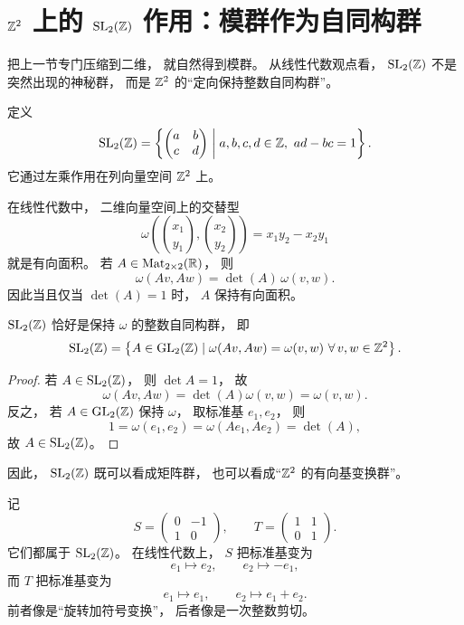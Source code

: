 \section{$\mathbb{Z}^2$ 上的 $\mathrm{SL}_2(\mathbb{Z})$ 作用：模群作为自同构群}




把上一节专门压缩到二维， 就自然得到模群。 从线性代数观点看， $\mathrm{SL}_2(\mathbb{Z})$ 不是突然出现的神秘群， 而是 $\mathbb{Z}^2$ 的“定向保持整数自同构群”。




\begin{definition}[模群] 定义 \[ \mathrm{SL}_2(\mathbb{Z})= \left\{ \begin{pmatrix} a&b\\ c&d \end{pmatrix} \;\middle|\; a,b,c,d\in\mathbb{Z},\ ad-bc=1 \right\}. \] 它通过左乘作用在列向量空间 $\mathbb{Z}^2$ 上。 \end{definition} 在线性代数中， 二维向量空间上的交替型 \[ \omega\!\left( \binom{x_1}{y_1}, \binom{x_2}{y_2} \right)=x_1y_2-x_2y_1 \] 就是有向面积。 若 $A\in \mathrm{Mat}_{2\times2}(\mathbb{R})$， 则 \[ \omega(Av,Aw)=\det(A)\,\omega(v,w). \] 因此当且仅当 $\det(A)=1$ 时， $A$ 保持有向面积。




\begin{proposition} $\mathrm{SL}_2(\mathbb{Z})$ 恰好是保持 $\omega$ 的整数自同构群， 即 \[ \mathrm{SL}_2(\mathbb{Z})= \left\{ A\in \mathrm{GL}_2(\mathbb{Z})\mid \omega(Av,Aw)=\omega(v,w)\ \forall\,v,w\in\mathbb{Z}^2 \right\}. \] \end{proposition}




\begin{proof} 若 $A\in \mathrm{SL}_2(\mathbb{Z})$， 则 $\det A=1$， 故 \[ \omega(Av,Aw)=\det(A)\omega(v,w)=\omega(v,w). \] 反之， 若 $A\in\mathrm{GL}_2(\mathbb{Z})$ 保持 $\omega$， 取标准基 $e_1,e_2$， 则 \[ 1=\omega(e_1,e_2)=\omega(Ae_1,Ae_2)=\det(A), \] 故 $A\in\mathrm{SL}_2(\mathbb{Z})$。 \end{proof} 因此， $\mathrm{SL}_2(\mathbb{Z})$ 既可以看成矩阵群， 也可以看成“$\mathbb{Z}^2$ 的有向基变换群”。




\begin{example}[两个基本生成元] 记 \[ S= \begin{pmatrix} 0&-1\\ 1&0 \end{pmatrix}, \qquad T= \begin{pmatrix} 1&1\\ 0&1 \end{pmatrix}. \] 它们都属于 $\mathrm{SL}_2(\mathbb{Z})$。 在线性代数上， $S$ 把标准基变为 \[ e_1\mapsto e_2,\qquad e_2\mapsto -e_1, \] 而 $T$ 把标准基变为 \[ e_1\mapsto e_1,\qquad e_2\mapsto e_1+e_2. \] 前者像是“旋转加符号变换”， 后者像是一次整数剪切。 \end{example}




